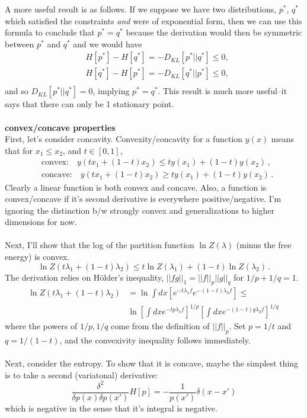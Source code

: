 \documentclass[a4paper,12pt]{article}
\begin{document}
A more useful result is as follows. If we suppose we have two distributions, $p^*$, $q^*$ which satisfied the constraints \textit{and} were of exponential form, then we can use this formula to conclude that $p^* = q^*$ because the derivation would then be symmetric between $p^*$ and $q^*$ and we would have
\begin{align}
& H[p^*] - H[q^*] = - D_{KL}[p^* || q^*] \le 0, \\
& H[q^*] - H[p^*] = - D_{KL}[q^* || p^*] \le 0, \\
\end{align}
and so $D_{KL}[p^* || q^*] = 0$, implying $p^* = q^*$. This result is much more useful--it says that there can only be 1 stationary point.
\\ \\
\textbf{convex/concave properties} \\
First, let's consider concavity. Convexity/concavity for a function $y(x)$ means that for $x_1 \le x_2$, and $t \in [0,1]$, 
\begin{align} 
& \text{convex:} \quad y(t x_1 + (1-t) x_2) \le t  y(x_1) + (1-t) y(x_2) \, , \\
& \text{concave:} \quad y(t x_1 + (1-t) x_2) \ge t  y(x_1) + (1-t) y(x_2) \, .
\end{align}
Clearly a linear function is both convex and concave. Also, a function is convex/concave if it's second derivative is everywhere positive/negative. I'm ignoring the distinction b/w strongly convex and generalizations to higher dimensions for now.
\\ \\
Next, I'll show that the log of the partition function $\ln Z(\lambda)$ (minus the free energy) is convex.
\begin{equation} 
\ln Z(t \lambda_1 + (1-t) \lambda_2) \le t \ln  Z(\lambda_1) + (1-t) \ln  Z(\lambda_2) \, .
\end{equation}
The derivation relies on H{\"o}lder's inequality, $ || f g ||_1 = ||f ||_p ||g ||_q$ for $1/p+1/q = 1$. 
\begin{align}
\ln Z(t \lambda_1 + (1-t) \lambda_2) &= \ln \int dx \left[ e^{-t \lambda_1 f} e^{-(1-t) \lambda_2 f} \right] \le \\
& \ln \left[ \int dx e^{-t p \lambda_1 f } \right]^{1/p} \left[ \int dx e^{-(1-t) q \lambda_2 f} \right]^{1/q} \, 
\end{align}
where the powers of $1/p, 1/q$ come from the definition of $||f||_p$. Set $p=1/t$ and $q=1/(1-t)$, and the convexivity inequality follows immediately. 
\\ \\
Next, consider the entropy. To show that it is concave, maybe the simplest thing is to take a second (variatonal) derivative:
\begin{equation}
\frac{\delta^2}{\delta p(x) \delta p(x')} H[p] = - \frac{1}{p(x')} \delta(x-x')
\end{equation}
which is negative in the sense that it's integral is negative. 
\end{document}
